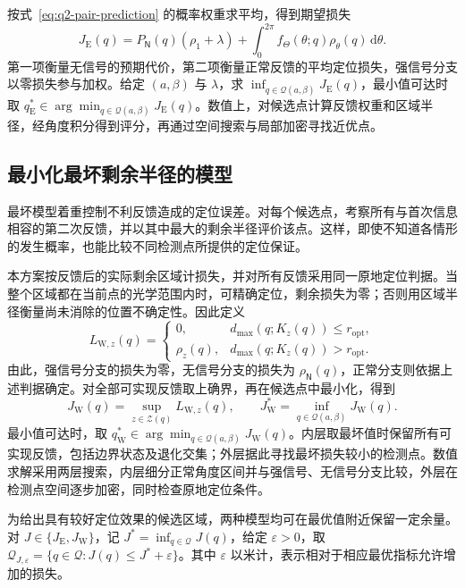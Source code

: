 按式~\eqref{eq:q2-pair-prediction} 的概率权重求平均，得到期望损失
\begin{equation}
 J_{\mathrm E}(q)
 =P_{\mathsf N}(q)(\rho_1+\lambda)
 +\int_0^{2\pi}f_\Theta(\theta;q)\rho_\theta(q)\,\mathrm d\theta.
\label{eq:q2-pair-expected-objective}
\end{equation}
第一项衡量无信号的预期代价，第二项衡量正常反馈的平均定位损失，强信号分支以零损失参与加权。给定 \((a,\beta)\) 与 \(\lambda\)，求 \(\inf_{q\in\mathcal Q(a,\beta)}J_{\mathrm E}(q)\)，最小值可达时取 \(q_{\mathrm E}^*\in\arg\min_{q\in\mathcal Q(a,\beta)}J_{\mathrm E}(q)\)。数值上，对候选点计算反馈权重和区域半径，经角度积分得到评分，再通过空间搜索与局部加密寻找近优点。

\subsection{最小化最坏剩余半径的模型}

最坏模型着重控制不利反馈造成的定位误差。对每个候选点，考察所有与首次信息相容的第二次反馈，并以其中最大的剩余半径评价该点。这样，即使不知道各情形的发生概率，也能比较不同检测点所提供的定位保证。

本方案按反馈后的实际剩余区域计损失，并对所有反馈采用同一原地定位判据。当整个区域都在当前点的光学范围内时，可精确定位，剩余损失为零；否则用区域半径衡量尚未消除的位置不确定性。因此定义
\begin{equation}
 L_{\mathrm W,z}(q)=
 \begin{cases}
 0,&d_{\max}(q;K_z(q))\le r_{\mathrm{opt}},\\
 \rho_z(q),&d_{\max}(q;K_z(q))>r_{\mathrm{opt}}.
 \end{cases}
\label{eq:q2-pair-worst-loss}
\end{equation}
由此，强信号分支的损失为零，无信号分支的损失为 \(\rho_{\mathsf N}(q)\)，正常分支则依据上述判据确定。对全部可实现反馈取上确界，再在候选点中最小化，得到
\begin{equation}
 J_{\mathrm W}(q)=\sup_{z\in\mathcal Z(q)}L_{\mathrm W,z}(q),
 \qquad J_{\mathrm W}^*=\inf_{q\in\mathcal Q(a,\beta)}J_{\mathrm W}(q).
\label{eq:q2-pair-worst-objective}
\end{equation}
最小值可达时，取 \(q_{\mathrm W}^*\in\arg\min_{q\in\mathcal Q(a,\beta)}J_{\mathrm W}(q)\)。内层取最坏值时保留所有可实现反馈，包括边界状态及退化交集；外层据此寻找最坏损失较小的检测点。数值求解采用两层搜索，内层细分正常角度区间并与强信号、无信号分支比较，外层在检测点空间逐步加密，同时检查原地定位条件。

为给出具有较好定位效果的候选区域，两种模型均可在最优值附近保留一定余量。对 \(J\in\{J_{\mathrm E},J_{\mathrm W}\}\)，记 \(J^*=\inf_{q\in\mathcal Q}J(q)\)，给定 \(\varepsilon>0\)，取 \(\mathcal Q_{J,\varepsilon}=\{q\in\mathcal Q:J(q)\le J^*+\varepsilon\}\)。其中 \(\varepsilon\) 以米计，表示相对于相应最优指标允许增加的损失。
